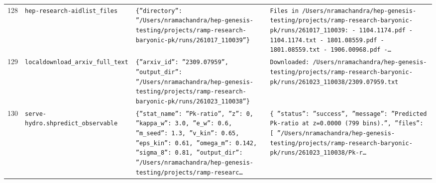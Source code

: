 \documentclass[11pt,a4paper]{article}
\begin{document}
\begin{longtable}{@{}p{}p{}p{}p{}@{}}
128 & \texttt{hep-research-aid}\newline\texttt{list\_\allowbreak{}files} & \texttt{\{''directory'':\allowbreak{} ''/\allowbreak{}Users/\allowbreak{}nramachandra/\allowbreak{}hep-genesis-testing/\allowbreak{}projects/\allowbreak{}ramp-research-baryonic-pk/\allowbreak{}runs/\allowbreak{}261017\_\allowbreak{}110039''\}\allowbreak{}} & \texttt{Files in /\allowbreak{}Users/\allowbreak{}nramachandra/\allowbreak{}hep-genesis-testing/\allowbreak{}projects/\allowbreak{}ramp-research-baryonic-pk/\allowbreak{}runs/\allowbreak{}261017\_\allowbreak{}110039:\allowbreak{}   - 1104.1174.pdf   - 1104.1174.txt   - 1801.08559.pdf   - 1801.08559.txt   - 1906.00968.pdf   -\ldots{}\allowbreak{}} \\
129 & \texttt{local}\newline\texttt{download\_\allowbreak{}arxiv\_\allowbreak{}full\_\allowbreak{}text} & \texttt{\{''arxiv\_\allowbreak{}id'':\allowbreak{} ''2309.07959'',\allowbreak{} ''output\_\allowbreak{}dir'':\allowbreak{} ''/\allowbreak{}Users/\allowbreak{}nramachandra/\allowbreak{}hep-genesis-testing/\allowbreak{}projects/\allowbreak{}ramp-research-baryonic-pk/\allowbreak{}runs/\allowbreak{}261023\_\allowbreak{}110038''\}\allowbreak{}} & \texttt{Downloaded:\allowbreak{} /\allowbreak{}Users/\allowbreak{}nramachandra/\allowbreak{}hep-genesis-testing/\allowbreak{}projects/\allowbreak{}ramp-research-baryonic-pk/\allowbreak{}runs/\allowbreak{}261023\_\allowbreak{}110038/\allowbreak{}2309.07959.txt} \\
130 & \texttt{serve-hydro.sh}\newline\texttt{predict\_\allowbreak{}observable} & \texttt{\{''stat\_\allowbreak{}name'':\allowbreak{} ''Pk-ratio'',\allowbreak{} ''z'':\allowbreak{} 0,\allowbreak{} ''kappa\_\allowbreak{}w'':\allowbreak{} 3.0,\allowbreak{} ''e\_\allowbreak{}w'':\allowbreak{} 0.6,\allowbreak{} ''m\_\allowbreak{}seed'':\allowbreak{} 1.3,\allowbreak{} ''v\_\allowbreak{}kin'':\allowbreak{} 0.65,\allowbreak{} ''eps\_\allowbreak{}kin'':\allowbreak{} 0.61,\allowbreak{} ''omega\_\allowbreak{}m'':\allowbreak{} 0.142,\allowbreak{} ''sigma\_\allowbreak{}8'':\allowbreak{} 0.81,\allowbreak{} ''output\_\allowbreak{}dir'':\allowbreak{} ''/\allowbreak{}Users/\allowbreak{}nramachandra/\allowbreak{}hep-genesis-testing/\allowbreak{}projects/\allowbreak{}ramp-researc\ldots{}\allowbreak{}} & \texttt{\{   ''status'':\allowbreak{} ''success'',\allowbreak{}   ''message'':\allowbreak{} ''Predicted Pk-ratio at z=\allowbreak{}0.0000 (799 bins)\allowbreak{}.'',\allowbreak{}   ''files'':\allowbreak{} [     ''/\allowbreak{}Users/\allowbreak{}nramachandra/\allowbreak{}hep-genesis-testing/\allowbreak{}projects/\allowbreak{}ramp-research-baryonic-pk/\allowbreak{}runs/\allowbreak{}261023\_\allowbreak{}110038/\allowbreak{}Pk-r\ldots{}\allowbreak{}} \\

\end{longtable}
\end{document}
